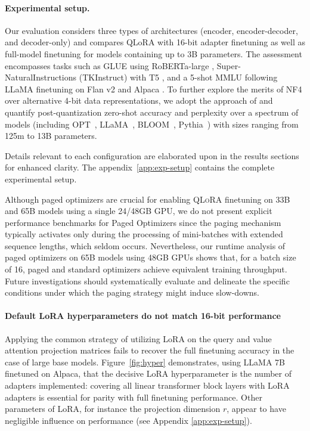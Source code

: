 \paragraph{Experimental setup.} Our evaluation considers three types of architectures (encoder, encoder-decoder, and decoder-only) and compares QLoRA with 16-bit adapter finetuning as well as full-model finetuning for models containing up to 3B parameters. The assessment encompasses tasks such as GLUE \citep{wang2018glue} using RoBERTa-large \citep{liu2019roberta}, Super-NaturalInstructions (TKInstruct) \citep{wang2022super} with T5 \citep{t5}, and a 5-shot MMLU \citep{hendrycksmeasuring} following LLaMA finetuning on Flan v2 \citep{longpre2023flan} and Alpaca \citep{alpaca}. To further explore the merits of NF4 over alternative 4-bit data representations, we adopt the approach of \citet{dettmers2022case} and quantify post-quantization zero-shot accuracy and perplexity over a spectrum of models (including OPT~\citep{zhang2022opt}, LLaMA~\citep{touvron2023llama}, BLOOM~\citep{scao2022bloom}, Pythia~\citep{biderman2023pythia}) with sizes ranging from 125m to 13B parameters.

Details relevant to each configuration are elaborated upon in the results sections for enhanced clarity. The appendix~\ref{app:exp-setup} contains the complete experimental setup.

Although paged optimizers are crucial for enabling \textsc{QLoRA} finetuning on 33B and 65B models using a single 24/48GB GPU, we do not present explicit performance benchmarks for Paged Optimizers since the paging mechanism typically activates only during the processing of mini-batches with extended sequence lengths, which seldom occurs. Nevertheless, our runtime analysis of paged optimizers on 65B models using 48GB GPUs shows that, for a batch size of 16, paged and standard optimizers achieve equivalent training throughput. Future investigations should systematically evaluate and delineate the specific conditions under which the paging strategy might induce slow-downs.

\paragraph{Default LoRA hyperparameters do not match 16-bit performance}

Applying the common strategy of utilizing LoRA on the query and value attention projection matrices \citep{hu2021lora} fails to recover the full finetuning accuracy in the case of large base models. Figure~\ref{fig:hyper} demonstrates, using LLaMA 7B finetuned on Alpaca, that the decisive LoRA hyperparameter is the number of adapters implemented: covering all linear transformer block layers with LoRA adapters is essential for parity with full finetuning performance. Other parameters of LoRA, for instance the projection dimension $r$, appear to have negligible influence on performance (see Appendix \ref{app:exp-setup}).

